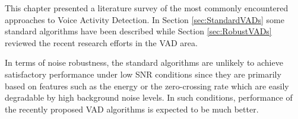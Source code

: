 This chapter presented a literature survey of the most commonly encountered approaches to Voice Activity Detection. In Section \ref{sec:StandardVADs} some standard algorithms have been described while Section \ref{sec:RobustVADs} reviewed the recent research efforts in the VAD area.

In terms of noise robustness, the standard algorithms are unlikely to achieve satisfactory performance under low SNR conditions since they are primarily based on features such as the energy or the zero-crossing rate which are easily degradable by high background noise levels. In such conditions, performance of the recently proposed VAD algorithms is expected to be much better.